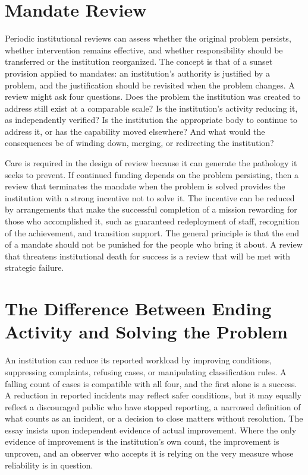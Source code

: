 \documentclass[11pt]{report}
\theoremstyle{definition}
\theoremstyle{remark}
\begin{document}
\section{Mandate Review}

Periodic institutional reviews can assess whether the original problem persists, whether intervention remains effective, and whether responsibility should be transferred or the institution reorganized. The concept is that of a sunset provision applied to mandates: an institution's authority is justified by a problem, and the justification should be revisited when the problem changes. A review might ask four questions. Does the problem the institution was created to address still exist at a comparable scale? Is the institution's activity reducing it, as independently verified? Is the institution the appropriate body to continue to address it, or has the capability moved elsewhere? And what would the consequences be of winding down, merging, or redirecting the institution?

Care is required in the design of review because it can generate the pathology it seeks to prevent. If continued funding depends on the problem persisting, then a review that terminates the mandate when the problem is solved provides the institution with a strong incentive not to solve it. The incentive can be reduced by arrangements that make the successful completion of a mission rewarding for those who accomplished it, such as guaranteed redeployment of staff, recognition of the achievement, and transition support. The general principle is that the end of a mandate should not be punished for the people who bring it about. A review that threatens institutional death for success is a review that will be met with strategic failure.

\section{The Difference Between Ending Activity and Solving the Problem}

An institution can reduce its reported workload by improving conditions, suppressing complaints, refusing cases, or manipulating classification rules. A falling count of cases is compatible with all four, and the first alone is a success. A reduction in reported incidents may reflect safer conditions, but it may equally reflect a discouraged public who have stopped reporting, a narrowed definition of what counts as an incident, or a decision to close matters without resolution. The essay insists upon independent evidence of actual improvement. Where the only evidence of improvement is the institution's own count, the improvement is unproven, and an observer who accepts it is relying on the very measure whose reliability is in question.
\end{document}
